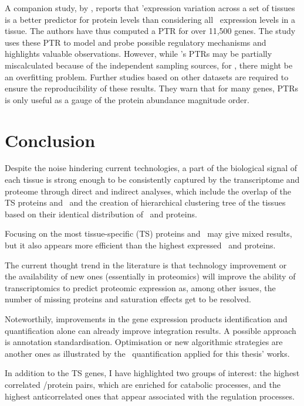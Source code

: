 A companion study, by \citet{Eraslan2019-md}, reports that
\mRNAs{}'expression variation across a set of tissues is
a better predictor for protein levels than
considering all \mRNAs\ expression levels in a tissue.
The authors have thus computed a \gls{PTR} for over 11,500 genes.
The study uses these \gls{PTR} to model and probe possible regulatory mechanisms
and highlights valuable observations.
However, while \citet{Franks2017-bp}'s \glspl{PTR} may be partially miscalculated
because of the independent sampling sources,
for \citet{Eraslan2019-md}, there might be an overfitting problem.
Further studies based on other datasets are required
to ensure the reproducibility of these results.
They warn that for many genes,
\glspl{PTR} is only useful as a gauge of the protein abundance magnitude order.\mybr\

\section{Conclusion}

Despite the noise hindering current technologies,
a part of the biological signal of each tissue
is strong enough to be consistently captured
by the transcriptome and proteome
through direct and indirect analyses,
which include the overlap of the \gls{TS} proteins and \mRNAs\
and the creation of hierarchical clustering tree of the tissues based
on their identical distribution of \mRNAs\ and proteins.

Focusing on the most tissue-specific (\gls{TS}) proteins and \mRNAs\
may give mixed results,
but it also appears more efficient than the highest expressed \mRNAs\ and proteins.

The current thought trend in the literature is that
technology improvement or the availability of new ones
(essentially in proteomics)
will improve the ability of transcriptomics to predict proteomic expression
as, among other issues,
the number of missing proteins and saturation effects get to be resolved.\mybr\

Noteworthily, improvements
in the gene expression products identification and quantification alone
can already improve integration results.
A possible approach is annotation standardisation.
Optimisation or new algorithmic strategies are another ones
as illustrated by the \PPKM\ quantification applied for this thesis' works.\mybr\

In addition to the \gls{TS} genes,
I have highlighted two groups of interest:
the highest correlated \mRNA/protein pairs,
which are enriched for catabolic processes,
and the highest anticorrelated ones
that appear associated with the regulation processes.

